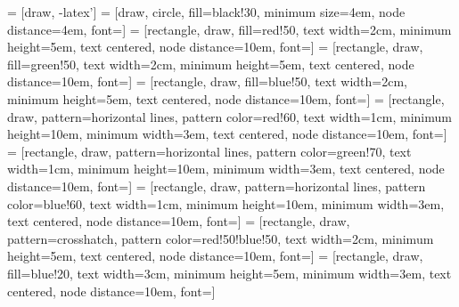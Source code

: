  = [draw, -latex']
 = [draw, circle, fill=black!30, minimum size=4em, node distance=4em, font=\fontsize{30}{10}\selectfont]
 = [rectangle, draw, fill=red!50, text width=2cm, minimum height=5em, text centered, node distance=10em, font=\fontsize{20}{10}\selectfont]
 = [rectangle, draw, fill=green!50, text width=2cm, minimum height=5em, text centered, node distance=10em, font=\fontsize{20}{10}\selectfont]
 = [rectangle, draw, fill=blue!50, text width=2cm, minimum height=5em, text centered, node distance=10em, font=\fontsize{20}{10}\selectfont]
 = [rectangle, draw,  pattern=horizontal lines, pattern color=red!60, text width=1cm, minimum height=10em, minimum width=3em, text centered, node distance=10em, font=\fontsize{25}{10}\selectfont]
 = [rectangle, draw,  pattern=horizontal lines, pattern color=green!70, text width=1cm, minimum height=10em, minimum width=3em, text centered, node distance=10em, font=\fontsize{20}{10}\selectfont]
 = [rectangle, draw,  pattern=horizontal lines, pattern color=blue!60, text width=1cm, minimum height=10em, minimum width=3em, text centered, node distance=10em, font=\fontsize{20}{10}\selectfont]
 = [rectangle, draw,  pattern=crosshatch, pattern color=red!50!blue!50, text width=2cm, minimum height=5em, text centered, node distance=10em, font=\fontsize{20}{10}\selectfont]
 = [rectangle, draw,  fill=blue!20, text width=3cm, minimum height=5em, minimum width=3em, text centered, node distance=10em, font=\fontsize{20}{10}\selectfont]